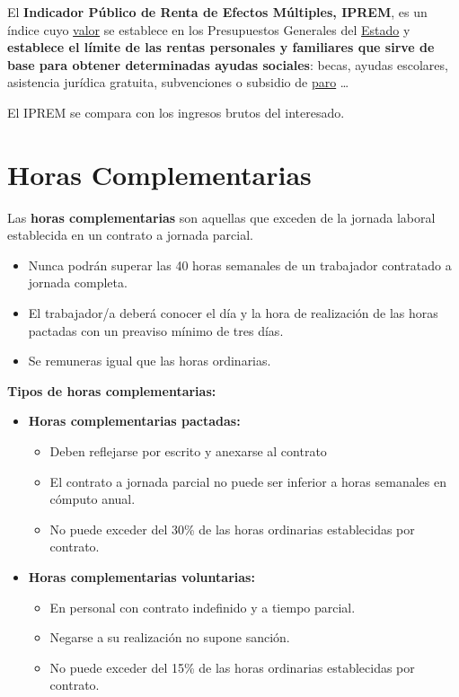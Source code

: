 \documentclass{article}
\begin{document}
	El \textbf{Indicador Público de Renta de Efectos Múltiples, IPREM}, es un índice cuyo \underline{valor} se establece en los Presupuestos Generales del \underline{Estado} y \textbf{establece el límite de las rentas personales y familiares que sirve de base para obtener determinadas ayudas sociales}: becas, ayudas escolares, asistencia jurídica gratuita, subvenciones o subsidio de \underline{paro} …
	
	El IPREM se compara con los ingresos brutos del interesado.
	
	\section*{Horas Complementarias}
	
	Las \textbf{horas complementarias} son aquellas que exceden de la jornada laboral establecida en un contrato a jornada parcial.
	
	\begin{itemize}
		\item Nunca podrán superar las 40 horas semanales de un trabajador contratado a jornada completa.
		\item El trabajador/a deberá conocer el día y la hora de realización de las horas pactadas con un preaviso mínimo de tres días.
		\item Se remuneras igual que las horas ordinarias.
	\end{itemize}
	
	\textbf{Tipos de horas complementarias:}
	
	\begin{itemize}
		\item \textbf{Horas complementarias pactadas:}
		\begin{itemize}
			\item Deben reflejarse por escrito y anexarse al contrato
			\item El contrato a jornada parcial no puede ser inferior a horas semanales en cómputo anual.
			\item No puede exceder del 30\% de las horas ordinarias establecidas por contrato.
		\end{itemize}
		\item \textbf{Horas complementarias voluntarias:}
		\begin{itemize}
			\item En personal con contrato indefinido y a tiempo parcial.
			\item Negarse a su realización no supone sanción.
			\item No puede exceder del 15\% de las horas ordinarias establecidas por contrato.
		\end{itemize}
	\end{itemize}
	
\end{document}
